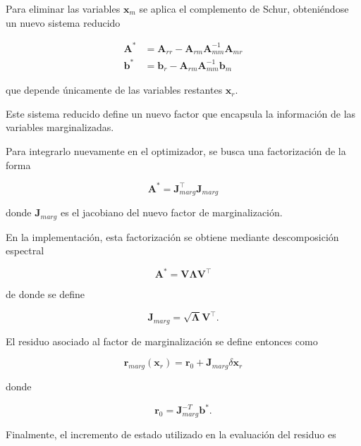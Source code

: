 Para eliminar las variables $\mathbf{x}_m$ se aplica el complemento de Schur, 
obteniéndose un nuevo sistema reducido

\begin{align}
\mathbf{A}^\ast &= 
\mathbf{A}_{rr} -
\mathbf{A}_{rm}
\mathbf{A}_{mm}^{-1}
\mathbf{A}_{mr}
\\
\mathbf{b}^\ast &=
\mathbf{b}_r -
\mathbf{A}_{rm}
\mathbf{A}_{mm}^{-1}
\mathbf{b}_m
\end{align}

\noindent que depende únicamente de las variables restantes $\mathbf{x}_r$.

Este sistema reducido define un nuevo factor que encapsula la información de las 
variables marginalizadas.

Para integrarlo nuevamente en el optimizador, se busca una factorización de la forma

\begin{equation}
\mathbf{A}^\ast =
\mathbf{J}_{marg}^\top
\mathbf{J}_{marg}
\end{equation}

\noindent donde $\mathbf{J}_{marg}$ es el jacobiano del nuevo factor de marginalización.

En la implementación, esta factorización se obtiene mediante descomposición espectral

\begin{equation}
\mathbf{A}^\ast =
\mathbf{V}
\mathbf{\Lambda}
\mathbf{V}^\top
\end{equation}

\noindent de donde se define

\begin{equation}
\mathbf{J}_{marg} =
\sqrt{\mathbf{\Lambda}}
\mathbf{V}^\top .
\end{equation}

El residuo asociado al factor de marginalización se define entonces como

\begin{equation}
\mathbf{r}_{marg}(\mathbf{x}_r)
=
\mathbf{r}_0
+
\mathbf{J}_{marg}
\delta\mathbf{x}_r
\end{equation}

\noindent donde

\begin{equation}
\mathbf{r}_0 =
\mathbf{J}_{marg}^{-T}
\mathbf{b}^\ast .
\end{equation}

Finalmente, el incremento de estado utilizado en la evaluación del residuo es

